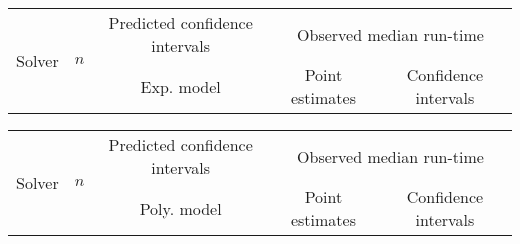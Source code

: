 \begin{tabular}{ccccc}
\hline 
\multirow{2}{*}{Solver} & \multirow{2}{*}{$n$} & Predicted confidence intervals & \multicolumn{2}{c}{Observed median  run-time}\tabularnewline
 &  & Exp. model  & Point estimates  & Confidence intervals\tabularnewline
\hline 
\hline 
\hline 
\end{tabular} 

\begin{tabular}{ccccc}
\hline 
\multirow{2}{*}{Solver} & \multirow{2}{*}{$n$} & Predicted confidence intervals & \multicolumn{2}{c}{Observed median  run-time}\tabularnewline
 &  & Poly. model  & Point estimates  & Confidence intervals\tabularnewline
\hline 
\hline 
\hline 
\end{tabular} 


